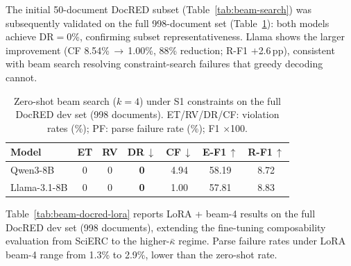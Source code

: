 The initial 50-document DocRED subset (Table~\ref{tab:beam-search}) was subsequently validated on the full 998-document set (Table~\ref{tab:beam-docred-998-zs}): both models achieve DR${=}$0\%, confirming subset representativeness.
Llama shows the larger improvement (CF 8.54\%\,$\to$\,1.00\%, 88\% reduction; R-F1 $+$2.6\,pp), consistent with beam search resolving constraint-search failures that greedy decoding cannot.

\begin{table}[h]
\centering
\small
\caption{Zero-shot beam search ($k{=}4$) under S1 constraints on the full DocRED dev set (998 documents).
ET/RV/DR/CF: violation rates (\%); PF: parse failure rate (\%); F1 $\times$100.}
\label{tab:beam-docred-998-zs}
\begin{tabular}{@{}lcccccc@{}}
\toprule
\textbf{Model} & ET & RV & DR$\,\downarrow$ & CF$\,\downarrow$ & E-F1$\,\uparrow$ & R-F1$\,\uparrow$ \\
\midrule
Qwen3-8B  & 0 & 0 & \textbf{0} & 4.94 & 58.19 & 8.72 \\
Llama-3.1-8B & 0 & 0 & \textbf{0} & 1.00 & 57.81 & 8.83 \\
\bottomrule
\end{tabular}
\end{table}

Table~\ref{tab:beam-docred-lora} reports LoRA + beam-4 results on the full DocRED dev set (998 documents), extending the fine-tuning composability evaluation from SciERC to the higher-$\bar{\kappa}$ regime.
Parse failure rates under LoRA beam-4 range from 1.3\% to 2.9\%, lower than the zero-shot rate.

\begin{table}[h]
\centering
\small
\caption{LoRA greedy vs.\ beam search ($k{=}4$) on DocRED (998 dev documents) under S1 constraints.
DR = domain/range, CF = cross-field violation rates (\%); PF = parse failure rate (\%); F1 $\times$ 100. ET and RV are 0\% in all rows.}
\label{tab:beam-docred-lora}
\end{table}

